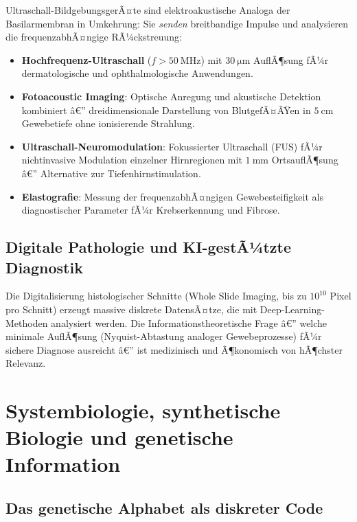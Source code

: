 ﻿\documentclass[12pt,a4paper,titlepage]{report}
\begin{document}
Ultraschall-BildgebungsgerÃ¤te sind elektroakustische Analoga der Basilarmembran in
Umkehrung: Sie \emph{senden} breitbandige Impulse und analysieren die frequenzabhÃ¤ngige
RÃ¼ckstreuung:
\begin{itemize}[leftmargin=2em]
    \item \textbf{Hochfrequenz-Ultraschall} ($f > \SI{50}{\mega\hertz}$) mit
        $\SI{30}{\micro\meter}$ AuflÃ¶sung fÃ¼r dermatologische und ophthalmologische
        Anwendungen.
    \item \textbf{Fotoacoustic Imaging}: Optische Anregung und akustische
        Detektion kombiniert â€” dreidimensionale Darstellung von BlutgefÃ¤ÃŸen
        in $\SI{5}{\centi\meter}$ Gewebetiefe ohne ionisierende Strahlung.
    \item \textbf{Ultraschall-Neuromodulation}: Fokussierter Ultraschall
        (FUS) fÃ¼r nichtinvasive Modulation einzelner Hirnregionen mit
        $\SI{1}{\milli\meter}$ OrtsauflÃ¶sung â€” Alternative zur Tiefenhirnstimulation.
    \item \textbf{Elastografie}: Messung der frequenzabhÃ¤ngigen Gewebesteifigkeit
        als diagnostischer Parameter fÃ¼r Krebserkennung und Fibrose.
\end{itemize}

\subsection{Digitale Pathologie und KI-gestÃ¼tzte Diagnostik}

Die Digitalisierung histologischer Schnitte (Whole Slide Imaging, bis zu
$10^{10}$ Pixel pro Schnitt) erzeugt massive diskrete DatensÃ¤tze, die mit
Deep-Learning-Methoden analysiert werden. Die Informationstheoretische Frage â€”
welche minimale AuflÃ¶sung (Nyquist-Abtastung analoger Gewebeprozesse) fÃ¼r
sichere Diagnose ausreicht â€” ist medizinisch und Ã¶konomisch von hÃ¶chster Relevanz.

\section{Systembiologie, synthetische Biologie und genetische Information}

\subsection{Das genetische Alphabet als diskreter Code}
\end{document}
